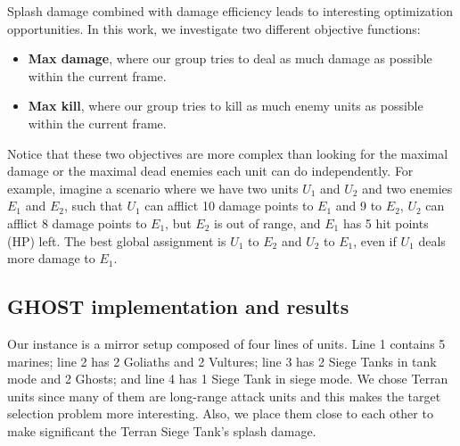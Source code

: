 \documentclass[journal]{IEEEtran}
\newcommand{\ghost}{\textsc{GHOST}\xspace}
\begin{document}
Splash  damage combined  with damage  efficiency leads  to interesting
optimization  opportunities.   In  this   work,  we  investigate  two
different objective functions:
\begin{itemize}
\item {\bf Max  damage}, where our group tries to  deal as much damage
  as possible within the current frame.
\item {\bf  Max kill},  where our  group tries to  kill as  much enemy
  units as possible within the current frame.
\end{itemize}
Notice that these two objectives are  more complex than looking for the
maximal  damage  or  the  maximal   dead  enemies  each  unit  can  do
independently. For example, imagine  a scenario where we  have two units $U_1$  and $U_2$
and two enemies $E_1$  and $E_2$, such that $U_1$ can  afflict 10 damage points
to $E_1$ and 9 to $E_2$, $U_2$ can afflict 8 damage points to $E_1$, but $E_2$ is out
of  range,  and $E_1$  has  5  hit points  (HP)  left.   The best  global
assignment is $U_1$ to  $E_2$ and $U_2$ to $E_1$, even if $U_1$  deals more damage to
$E_1$.

\subsection{\ghost implementation and results}

Our instance is a mirror setup composed of four lines of units. Line 1
contains 5 marines; line 2 has 2 Goliaths and 2 Vultures; line 3 has 2 Siege
Tanks in tank mode  and 2 Ghosts; and line 4 has 1 Siege  Tank in siege mode.
We chose  Terran units  since many of  them are
long-range attack  units and this  makes the target  selection problem
more  interesting.  Also,  we place  them close to each
other to make significant the Terran Siege Tank's splash damage.
\end{document}
